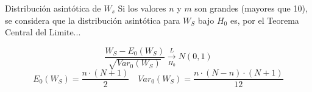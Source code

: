 \vspace{5mm}

Distribución asintótica de $W_s$
Si los valores $n$ y $m$ son grandes (mayores que 10), se considera que la distribución asintótica para $W_S$ bajo $H_0$ es, por el Teorema Central del Limite...

\[
    \frac{W_S-E_0(W_S)}{\sqrt{Var_{0}(W_S)}} \xrightarrow[H_0]{L} N(0,1)
\]
\[
    E_0(W_S)=\frac{n \cdot (N+1)}{2} \quad Var_0(W_S)=\frac{n \cdot (N-n) \cdot (N+1)}{12}
\]